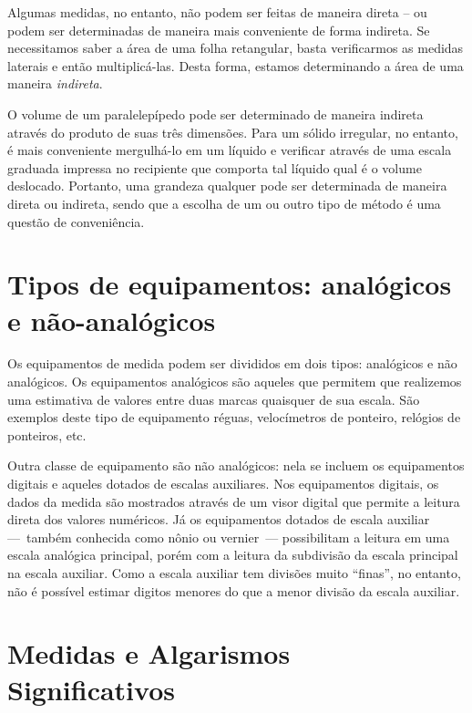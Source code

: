 Algumas medidas, no entanto, não podem ser feitas de maneira direta -- ou podem ser determinadas de maneira mais conveniente de forma indireta. Se necessitamos saber a área de uma folha retangular, basta verificarmos as medidas laterais e então multiplicá-las. Desta forma, estamos determinando a área de uma maneira \emph{indireta}.

O volume de um paralelepípedo pode ser determinado de maneira indireta através do produto de suas três dimensões. Para um sólido irregular, no entanto, é mais conveniente mergulhá-lo em um líquido e verificar através de uma escala graduada impressa no recipiente que comporta tal líquido qual é o volume deslocado. Portanto, uma grandeza qualquer pode ser determinada de maneira direta ou indireta, sendo que a escolha de um ou outro tipo de método é uma questão de conveniência.

\section{Tipos de equipamentos: analógicos e não-analógicos}

Os equipamentos de medida podem ser divididos em dois tipos: analógicos e não analógicos. Os equipamentos analógicos são aqueles que permitem que realizemos uma estimativa de valores entre duas marcas quaisquer de sua escala. São exemplos deste tipo de equipamento réguas, velocímetros de ponteiro, relógios de ponteiros, etc.

Outra classe de equipamento são não analógicos: nela se incluem os equipamentos digitais e aqueles dotados de escalas auxiliares. Nos equipamentos digitais, os dados da medida são mostrados através de um visor digital que permite a leitura direta dos valores numéricos. Já os equipamentos dotados de escala auxiliar ---~também conhecida como nônio ou vernier~--- possibilitam a leitura em uma escala analógica principal, porém com a leitura da subdivisão da escala principal na escala auxiliar. Como a escala auxiliar tem divisões muito ``finas'', no entanto, não é possível estimar digitos menores do que a menor divisão da escala auxiliar.

\section{Medidas e Algarismos Significativos}

